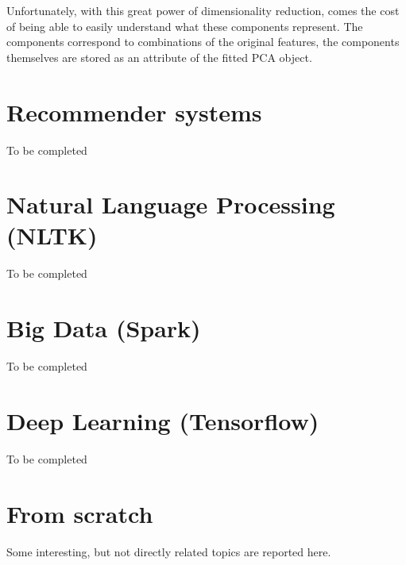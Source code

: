 \documentclass[11pt]{article}
\begin{document}
Unfortunately, with this great power of dimensionality reduction, comes the cost of being able to easily understand what these components represent. The components correspond to combinations of the original features, the components themselves are stored as an attribute of the fitted PCA object.


\section{Recommender systems}
To be completed


\section{Natural Language Processing (NLTK)}
To be completed

\section{Big Data (Spark)}
To be completed

\section{Deep Learning (Tensorflow)}
To be completed

\clearpage
\appendix
\section{From scratch}\label{sec:app1}
Some interesting, but not directly related topics are reported here.
\end{document}
